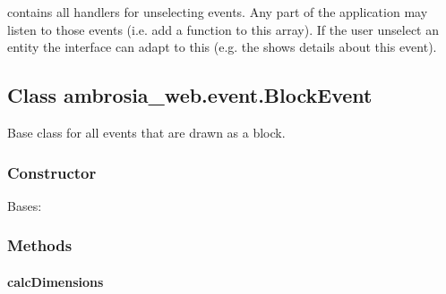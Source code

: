 \documentclass[letterpaper,10pt,english]{sphinxmanual}
\begin{document}
contains all handlers for unselecting events. Any part of the application may listen to those events (i.e. add a
function to this array). If the user unselect an entity the interface can adapt to this (e.g. the
{\hyperref[ambrosia_web.view.detailsview.DetailsView:ambrosia_web.view.detailsview.DetailsView]{}} shows details about this event).


\subsection{Class ambrosia\_web.event.BlockEvent}
\label{ambrosia_web.event.BlockEvent:class-ambrosia-web-event-blockevent}\label{ambrosia_web.event.BlockEvent::doc}
Base class for all events that are drawn as a block.


\subsubsection{Constructor}
\label{ambrosia_web.event.BlockEvent:constructor}

\begin{fulllineitems}
\label{ambrosia_web.event.BlockEvent:ambrosia_web.event.BlockEvent}
Bases: {\hyperref[ambrosia_web.event.Event:ambrosia_web.event.Event]{}}

\end{fulllineitems}



\subsubsection{Methods}
\label{ambrosia_web.event.BlockEvent:methods}

\paragraph{calcDimensions}
\label{ambrosia_web.event.BlockEvent:calcdimensions}
\end{document}
